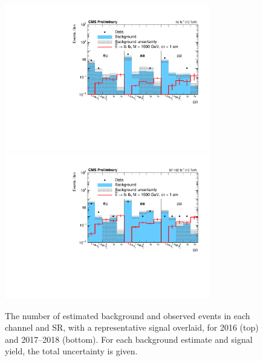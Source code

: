 \begin{figure}
\centering
\includegraphics[width=0.8\textwidth]{figures/results/SR2016yields_CMSPreliminary.pdf}
\includegraphics[width=0.8\textwidth]{figures/results/SR201718yields_CMSPreliminary.pdf}
\caption{The number of estimated background and observed events in each channel and SR, with a representative signal overlaid, for 2016 (top) and 2017--2018 (bottom). For each background estimate and signal yield, the total uncertainty is given.}
\label{yields_individual}
\end{figure}

